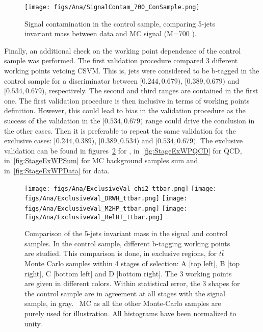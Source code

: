 \begin{figure}[!Hhtbp]
  \begin{center}
    \texttt{[image: figs/Ana/SignalContam\_700\_ConSample.png]}
    \caption{Signal contamination in the control sample, comparing 5-jets invariant mass between data and MC signal (M=700 \GeVcc).}
    \label{fig:SigContamination}
  \end{center}
\end{figure}

Finally, an additional check on the working point dependence of the control sample was performed. The first validation procedure compared 3 different working points vetoing CSVM. This is, jets were considered to be b-tagged in the control sample for a discriminator between $[0.244,0.679)$, $[0.389,0.679)$ and $[0.534,0.679)$, respectively. The second and third ranges are contained in the first one. The first validation procedure is then inclusive in terms of working points definition. However, this could lead to bias in the validation procedure as the success of the validation in the $[0.534,0.679)$ range could drive the conclusion in the other cases. Then it is preferable to repeat the same validation for the exclusive cases: $[0.244,0.389)$, $[0.389,0.534)$ and $[0.534,0.679)$. The exclusive validation can be found in figures~\ref{fig:StageExWPttbar} for \ttbar, in~\ref{fig:StageExWPQCD} for QCD, in~\ref{fig:StageExWPSum} for MC background samples sum and in~\ref{fig:StageExWPData} for data. %

\begin{figure}[!Hhtbp]
  \begin{center}
    \texttt{[image: figs/Ana/ExclusiveVal\_chi2\_ttbar.png]}
    \texttt{[image: figs/Ana/ExclusiveVal\_DRWH\_ttbar.png]}
    \texttt{[image: figs/Ana/ExclusiveVal\_M2HP\_ttbar.png]}
    \texttt{[image: figs/Ana/ExclusiveVal\_RelHT\_ttbar.png]}
    \caption{Comparison of the 5-jets invariant mass in the signal and control samples. In the control sample, different b-tagging working points are studied. This comparison is done, in exclusive regions, for $t\bar{t}$ Monte Carlo samples within 4 stages of selection: A [top left], B [top right], C [bottom left] and D [bottom right]. The 3 working points are given in different colors. Within statistical error, the 3 shapes for the control sample are in agreement at all stages with the signal sample, in gray. \ttbar~MC as all the other Monte-Carlo samples are purely used for illustration. All histograms have been normalized to unity.}
    \label{fig:StageExWPttbar}
  \end{center}
\end{figure}

